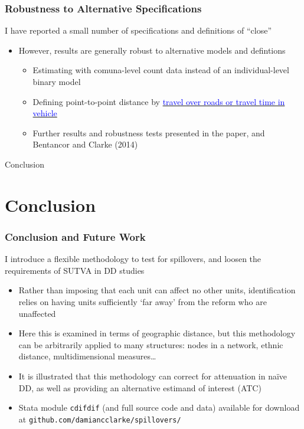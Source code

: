 \documentclass[10pt,letterpaper,subeqn]{beamer}
\begin{document}
\begin{frame}[label=robust]
 \frametitle{Robustness to Alternative Specifications}
I have reported a small number of specifications and definitions of ``close''
\vspace{4mm}
\begin{itemize}
\item However, results are generally robust to alternative models and defintions
\begin{itemize}
\item Estimating with comuna-level count data instead of an individual-level binary model
\item Defining point-to-point distance by \hyperlink{distance}{\textcolor{blue}{travel over roads or travel time in vehicle}}
\item Further results and robustness tests presented in the paper, and Bentancor and Clarke (2014)
\end{itemize}
\end{itemize}
\end{frame}


\begin{frame}
\begin{center}
\Large Conclusion
\end{center}
\end{frame}


\section{Conclusion}
\begin{frame}[label=concl]
  \frametitle{Conclusion and Future Work}
I introduce a flexible methodology to test for spillovers, and loosen the 
requirements of SUTVA in DD studies
\vspace{4mm}
\begin{itemize}
\item Rather than imposing that each unit can affect no other units, identification
relies on having units sufficiently `far away' from the reform who are unaffected
\item Here this is examined in terms of geographic distance, but this methodology
can be arbitrarily applied to many structures: nodes in a network, ethnic distance, 
multidimensional measures\ldots
\item It is illustrated that this methodology can correct for attenuation in
na\"ive DD, as well as providing an alternative estimand of interest (ATC)
\item Stata module \texttt{cdifdif} (and full source code and data) 
  available for download at \texttt{github.com/damiancclarke/spillovers/}
\end{itemize}
\end{frame}
\end{document}
